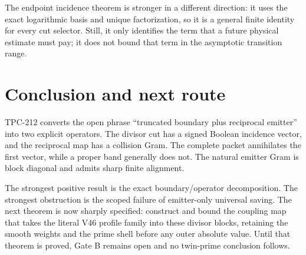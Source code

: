 \documentclass[11pt]{article}
\theoremstyle{definition}
\theoremstyle{remark}
\begin{document}
The endpoint incidence theorem is stronger in a different direction: it uses
the exact logarithmic basis and unique factorization, so it is a general finite
identity for every cut selector.  Still, it only identifies the term that a
future physical estimate must pay; it does not bound that term in the asymptotic
transition range.

\section{Conclusion and next route}

TPC-212 converts the open phrase ``truncated boundary plus reciprocal emitter''
into two explicit operators.  The divisor cut has a signed Boolean incidence
vector, and the reciprocal map has a collision Gram.  The complete packet
annihilates the first vector, while a proper band generally does not.  The
natural emitter Gram is block diagonal and admits sharp finite alignment.

The strongest positive result is the exact boundary/operator decomposition.  The
strongest obstruction is the scoped failure of emitter-only universal saving.
The next theorem is now sharply specified: construct and bound the coupling map
that takes the literal V46 profile family into these divisor blocks, retaining
the smooth weights and the prime shell before any outer absolute value.  Until
that theorem is proved, Gate B remains open and no twin-prime conclusion follows.



\end{document}
